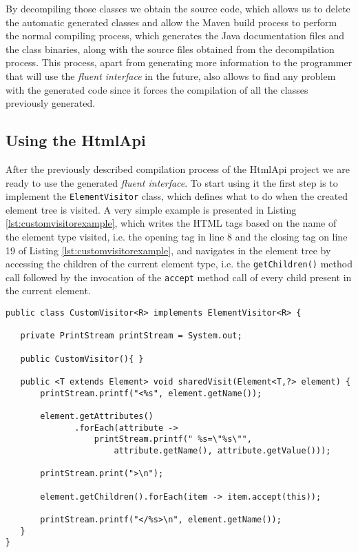 \noindent
By decompiling those classes we obtain the source code, which allows us to delete the automatic generated classes and allow the Maven build process to perform the normal compiling process, which generates the Java documentation files and the class binaries, along with the source files obtained from the decompilation process. This process, apart from generating more information to the programmer that will use the \textit{fluent interface} in the future, also allows to find any problem with the generated code since it forces the compilation of all the classes previously generated.

\subsection{Using the HtmlApi}

After the previously described compilation process of the HtmlApi project we are ready to use the generated \textit{fluent interface}. To start using it the first step is to implement the \texttt{ElementVisitor} class, which defines what to do when the created element tree is visited. A very simple example is presented in Listing \ref{lst:customvisitorexample}, which writes the \ac{HTML} tags based on the name of the element type visited, i.e. the opening tag in line 8 and the closing tag on line 19 of Listing \ref{lst:customvisitorexample}, and navigates in the element tree by accessing the children of the current element type, i.e. the \texttt{getChildren()} method call followed by the invocation of the \texttt{accept} method call of every child present in the current element.

\bigskip


\begin{minipage}{\linewidth}
\begin{lstlisting}[caption={Custom Visitor Example that Implements the ElementVisitor Generated by XsdAsm},label={lst:customvisitorexample}]
public class CustomVisitor<R> implements ElementVisitor<R> {

   private PrintStream printStream = System.out;

   public CustomVisitor(){ }

   public <T extends Element> void sharedVisit(Element<T,?> element) {
       printStream.printf("<%s", element.getName());

       element.getAttributes()
              .forEach(attribute -> 
                  printStream.printf(" %s=\"%s\"", 
                      attribute.getName(), attribute.getValue()));

       printStream.print(">\n");

       element.getChildren().forEach(item -> item.accept(this));

       printStream.printf("</%s>\n", element.getName());
   }
}
\end{lstlisting}
\end{minipage}

